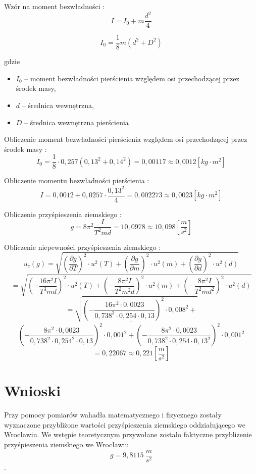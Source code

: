 \documentclass[12pt]{article}
\begin{document}
Wzór na moment bezwładności :
$$ I = I_0 + m \frac{d^2}{4} $$

$$ I_0 = \frac{1}{8}m (d^2 + D^2) $$

gdzie
\begin{itemize}
    \item $I_0$ -- moment bezwładności pierścienia względem osi przechodzącej przez środek masy,
    \item $d$ -- średnica wewnętrzna, 
    \item $D$ -- średnica wewnętrzna pierścienia
\end{itemize}

Obliczenie moment bezwładności pierścienia względem osi przechodzącej przez środek masy : 
$$ I_0 = \frac{1}{8} \cdot 0,257 (0,13^2 + 0,14^2) = 0,00117 \approx 0,0012 [kg \cdot m^2] $$

Obliczenie momentu bezwładności pierścienia :
$$ I = 0,0012 + 0,0257 \cdot \frac{0,13^2}{4} = 0,002273 \approx 0,0023 [kg \cdot m^2] $$

Obliczenie przyśpieszenia ziemskiego :
$$ g = 8 \pi^2 \frac{I}{T^2 md} = 10,0978 \approx 10,098 \left[ \frac{m}{s^2} \right] $$ 

Obliczenie niepewności przyśpieszenia ziemskiego :
$$ u_c(g) = \sqrt{ \left( \frac{\partial g}{\partial T} \right)^2 \cdot u^2(T) + 
\left( \frac{\partial g}{\partial m} \right)^2 \cdot u^2(m) + \left( \frac{\partial g}{\partial d} \right)^2 \cdot u^2(d) } $$
$$ = \sqrt{ \left( -\frac{16\pi^2 I}{T^3 md} \right)^2 \cdot u^2(T) + \left( -\frac{8\pi^2 I}{T^2 m^2 d} \right)^2 \cdot u^2(m) + \left( -\frac{8\pi^2 I}{T^2 md^2} \right)^2 \cdot u^2(d) } $$
$$ = \sqrt{ \left( -\frac{16\pi^2 \cdot 0,0023}{0,738^3 \cdot 0,254 \cdot 0,13} \right)^2 \cdot 0,008^2 + }
$$ $$ \overline{\left( -\frac{8\pi^2 \cdot 0,0023}{0,738^2 \cdot 0,254^2 \cdot 0,13} \right)^2 \cdot 0,001^2 + 
\left( -\frac{8\pi^2 \cdot 0,0023}{0,738^2 \cdot 0,254 \cdot 0,13^2} \right)^2 \cdot 0,001^2 } $$
$$ = 0,22067 \approx 0,221 \left[\frac{m}{s^2}\right] $$

\section{Wnioski}

Przy pomocy pomiarów wahadła matematycznego i fizycznego zostały wyznaczone przybliżone wartości przyśpieszenia ziemskiego oddziałującego we Wrocławiu.
We wstępie teoretycznym przywołane zostało faktyczne przybliżenie przyśpieszenia ziemskiego we Wrocławiu 
$$ g = 9,8115 \ \frac{m}{s^2} $$.
\end{document}
